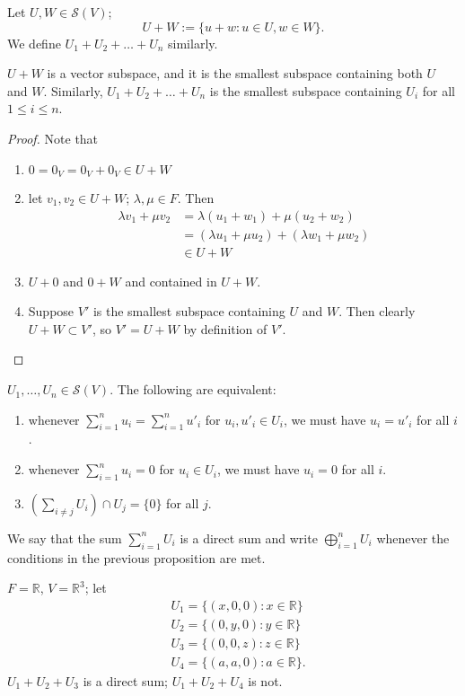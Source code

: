 \documentclass{scrartcl}
\def\le{\leqslant}
\def\R{\mathbb{R}}
\begin{document}
\begin{definition}
	Let $U, W \in \mathcal{S}(V)$; 
	\[U+W := \{u+w: u\in U, w\in W\}.\]
	We define $U_1+U_2+\dots+U_n$ similarly. 
\end{definition}
\begin{proposition}
	$U+W$ is a vector subspace, and it is the smallest subspace containing both $U$ and $W$. Similarly, $U_1+U_2+\dots+U_n$ is the smallest subspace containing $U_i$ for all $1\le i\le n$.
\end{proposition}
\begin{proof}
	Note that 
	\begin{enumerate}
		\item $0 = 0_V = 0_V+0_V \in U + W$
		\item let $v_1, v_2 \in U+W$; $\lambda, \mu \in F$. Then 
		\begin{align*}
			\lambda v_1 + \mu v_2 &= \lambda(u_1+w_1) + \mu(u_2+w_2) \\
			&= (\lambda u_1+\mu u_2) + (\lambda w_1+\mu w_2) \\
			&\in U+W
		\end{align*}
		\item $U+0$ and $0+W$ and contained in $U+W$. 
		\item Suppose $V'$ is the smallest subspace containing $U$ and $W$. Then clearly $U+W \subset V'$, so $V' = U+W$ by definition of $V'$. 
	\end{enumerate}
\end{proof}
\begin{proposition}
	$U_1, \dots, U_n \in \mathcal{S}(V)$. The following are equivalent:
	\begin{enumerate}
		\item whenever $\sum_{i=1}^n u_i = \sum_{i=1}^n u'_i$ for $u_i, u'_i \in U_i$, we must have $u_i = u'_i$ for all $i$.
		\item whenever $\sum_{i=1}^n u_i = 0$ for $u_i \in U_i$, we must have $u_i = 0$ for all $i$.
		\item $(\sum_{i\ne j} U_i) \cap U_j = \{0\}$ for all $j$.
	\end{enumerate}
\end{proposition}
\begin{definition}
	We say that the sum $\sum_{i=1}^n U_i$ is a direct sum and write $\bigoplus_{i=1}^n U_i$ whenever the conditions in the previous proposition are met. 
\end{definition}
\begin{example}
	$F = \R$, $V=\R^3$; let
	\begin{align*}
		&U_1 = \{(x, 0, 0): x\in \R\} \\
		&U_2 = \{(0, y, 0): y\in \R\}\\
		&U_3 = \{(0, 0, z): z\in \R\}\\
		&U_4 = \{(a, a, 0): a\in \R\}.
	\end{align*}
	$U_1+U_2+U_3$ is a direct sum; $U_1+U_2+U_4$ is not. 
\end{example}
\end{document}
